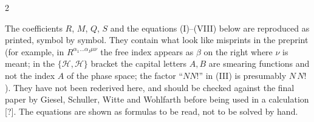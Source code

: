 \begin{paracol}{2}
\begin{coursenote}
The coefficients $R$, $M$, $Q$, $S$ and the equations (I)--(VIII) below are reproduced as printed, symbol by symbol. They contain what look like misprints in the preprint (for example, in $R^{\alpha_1\dots\alpha_I\mu\nu}$ the free index appears as $\beta$ on the right where $\nu$ is meant; in the $\{\mathcal H,\mathcal H\}$ bracket the capital letters $A,B$ are smearing functions and not the index $A$ of the phase space; the factor ``$NN!$'' in (III) is presumably $N\,N!$). They have not been rederived here, and should be checked against the final paper by Giesel, Schuller, Witte and Wohlfarth before being used in a calculation [?]. The equations are shown as formulas to be read, not to be solved by hand.
\end{coursenote}


\end{paracol}
